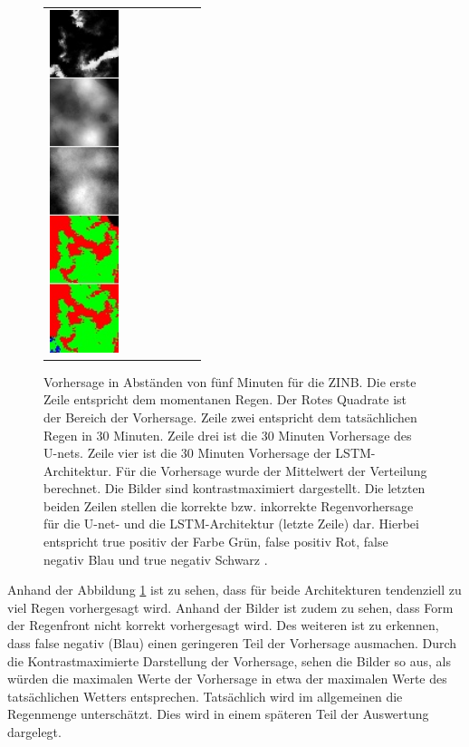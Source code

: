 \begin{figure}[h]
\begin{tabular}{lllllll}
\includegraphics[width=20mm]{abb/prediction/106_maxCont}
\end{tabular}
\caption{Vorhersage in Abständen von fünf Minuten für die ZINB. Die erste Zeile entspricht dem momentanen Regen. Der Rotes Quadrate ist der Bereich der Vorhersage. Zeile zwei entspricht dem tatsächlichen Regen in 30 Minuten. Zeile drei ist die 30 Minuten Vorhersage des U-nets. Zeile vier ist die 30 Minuten Vorhersage der LSTM-Architektur. Für die Vorhersage wurde der Mittelwert der Verteilung berechnet. Die Bilder sind kontrastmaximiert dargestellt. Die letzten beiden Zeilen stellen die korrekte bzw. inkorrekte Regenvorhersage für die U-net- und die LSTM-Architektur (letzte Zeile) dar.
Hierbei entspricht true positiv der Farbe Grün, false positiv Rot, false negativ Blau und true negativ Schwarz .\label{fig:predNegBin}}
\end{figure}


\noindent Anhand der Abbildung \ref{fig:predNegBin} ist zu sehen, dass für beide Architekturen tendenziell zu viel Regen vorhergesagt wird. Anhand der Bilder ist zudem zu sehen, dass Form der Regenfront nicht korrekt vorhergesagt wird. Des weiteren ist zu erkennen, dass false negativ (Blau) einen geringeren Teil der Vorhersage ausmachen. Durch die Kontrastmaximierte Darstellung der Vorhersage, sehen die Bilder so aus, als würden die maximalen Werte der Vorhersage in etwa der maximalen Werte des tatsächlichen Wetters entsprechen. Tatsächlich wird im allgemeinen die Regenmenge unterschätzt. Dies wird in einem späteren Teil der Auswertung dargelegt.\\


